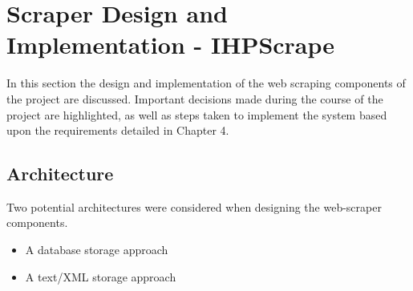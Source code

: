 \chapter{Scraper Design and Implementation - IHPScrape}\label{C:us}

In this section the design and implementation of the web scraping components of the project are discussed. Important decisions made during the course of the project are highlighted, as well as steps taken to implement the system based upon the requirements detailed in Chapter 4.







\section{Architecture}

Two potential architectures were considered when designing the web-scraper components.

\begin{itemize}
 \item A database storage approach
 \item A text/XML storage approach
\end{itemize}


